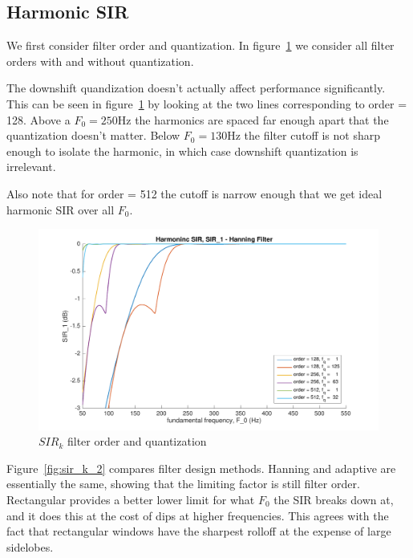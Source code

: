 \documentclass [11pt, proquest,oneside] {ganter_thesis}[2015/03/03]
\begin{document}
\clearpage

\subsection{Harmonic SIR}

We first consider filter order and quantization.  In figure~\ref{fig:sir_k_1} we consider all filter orders with and without quantization.

The downshift quandization doesn't actually affect performance significantly.  This can be seen in figure~\ref{fig:sir_k_1} by looking at the two lines corresponding to order = 128.  Above a $F_0 = 250$Hz the harmonics are spaced far enough apart that the quantization doesn't matter.  Below $F_0 = 130$Hz the filter cutoff is not sharp enough to isolate the harmonic, in which case downshift quantization is irrelevant.

Also note that for order = 512 the cutoff is narrow enough that we get ideal harmonic SIR over all $F_0$.

\begin{figure}[!ht]
  \centering
    \includegraphics[width=1\textwidth]{sir_k_1}   
    \caption{$SIR_k$ filter order and quantization}\label{fig:sir_k_1}
\end{figure}

Figure~\ref{fig:sir_k_2} compares filter design methods.  Hanning and adaptive are essentially the same, showing that the limiting factor is still filter order.  Rectangular provides a better lower limit for what $F_0$ the SIR breaks down at, and it does this at the cost of dips at higher frequencies.  This agrees with the fact that rectangular windows have the sharpest rolloff at the expense of large sidelobes.
\end{document}
